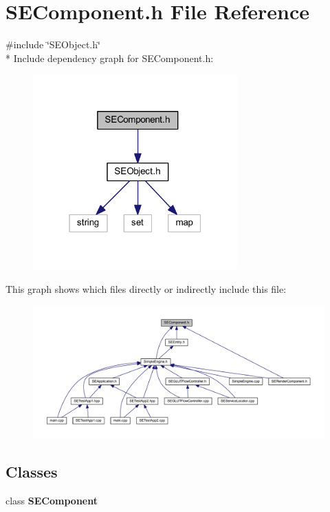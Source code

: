 \section{S\+E\+Component.\+h File Reference}
\label{_s_e_component_8h}
{\ttfamily \#include \char`\"{}S\+E\+Object.\+h\char`\"{}}\\*
Include dependency graph for S\+E\+Component.\+h\+:
\nopagebreak
\begin{figure}[H]
\begin{center}
\leavevmode
\includegraphics[width=223pt]{_s_e_component_8h__incl}
\end{center}
\end{figure}
This graph shows which files directly or indirectly include this file\+:
\nopagebreak
\begin{figure}[H]
\begin{center}
\leavevmode
\includegraphics[width=350pt]{_s_e_component_8h__dep__incl}
\end{center}
\end{figure}
\subsection*{Classes}
\begin{DoxyCompactItemize}
\item 
class {\bf S\+E\+Component}
\end{DoxyCompactItemize}
